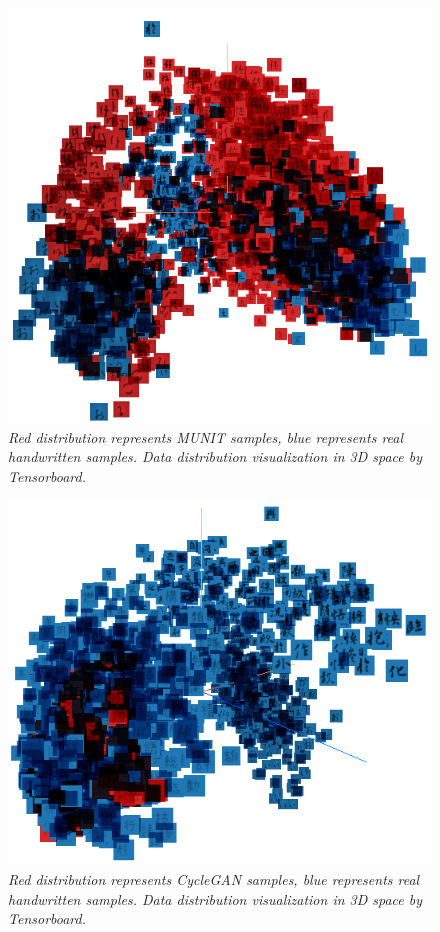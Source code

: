 \documentclass[12pt]{report}
\begin{document}
\begin{figure}[h]
	\centering
	\includegraphics[scale=1]{real-munit}
	\caption{\textit{Red distribution represents MUNIT samples, blue represents real handwritten samples. Data distribution visualization in 3D space by Tensorboard. }}
	\label{fig:data-distribution-2}
\end{figure}

\begin{figure}[h]
	\centering
	\includegraphics[scale=1]{real-cyclegan}
	\caption{\textit{Red distribution represents CycleGAN samples, blue represents real handwritten samples. Data distribution visualization in 3D space by Tensorboard. }}
	\label{fig:data-distribution-2}
\end{figure}
\end{document}
